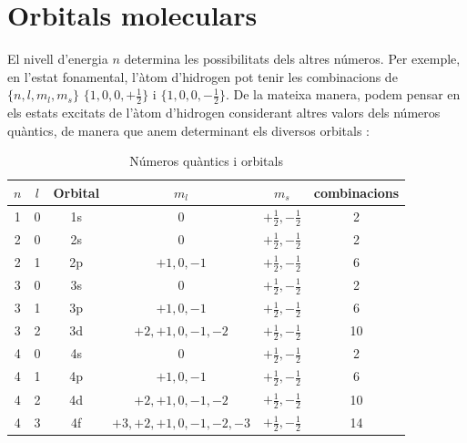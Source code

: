 \section{Orbitals moleculars}
El nivell d'energia $n$ determina les possibilitats dels altres números. Per exemple, en l'estat fonamental, l'àtom d'hidrogen pot tenir les combinacions de $\{n,l,m_l,m_s\}$ $\{1,0,0,+\frac{1}{2}\}$ i $\{1,0,0,-\frac{1}{2}\}$. De la mateixa manera, podem pensar en els estats excitats de l'àtom d'hidrogen considerant altres valors dels números quàntics, de manera que anem determinant els diversos orbitals :
\begin{table}[h!]
  \begin{center}
    \caption{Números quàntics i orbitals \cite{Mahan1977}}
    \label{tab:quant}
    \begin{tabular}{cccccc}
      \hline
      $n$ & $l$ & Orbital & $m_l$ & $m_s$ & combinacions\\
      \hline
      1 & 0 & 1s & 0 & $+\frac{1}{2},-\frac{1}{2}$ & 2 \\
      2 & 0 & 2s & 0 & $+\frac{1}{2},-\frac{1}{2}$ & 2 \\
      2 & 1 & 2p & $+1,0,-1$ & $+\frac{1}{2},-\frac{1}{2}$ & 6 \\
      3 & 0 & 3s & 0 & $+\frac{1}{2},-\frac{1}{2}$ & 2 \\
      3 & 1 & 3p & $+1,0,-1$ & $+\frac{1}{2},-\frac{1}{2}$ & 6 \\
      3 & 2 & 3d & $+2,+1,0,-1,-2$ & $+\frac{1}{2},-\frac{1}{2}$ & 10 \\
      4 & 0 & 4s & 0 & $+\frac{1}{2},-\frac{1}{2}$ & 2 \\
      4 & 1 & 4p & $+1,0,-1$ & $+\frac{1}{2},-\frac{1}{2}$ & 6 \\
      4 & 2 & 4d & $+2,+1,0,-1,-2$ & $+\frac{1}{2},-\frac{1}{2}$ & 10 \\
      4 & 3 & 4f & $+3,+2,+1,0,-1,-2,-3$ & $+\frac{1}{2},-\frac{1}{2}$ & 14 \\
      \hline
    \end{tabular}
  \end{center}
\end{table}

